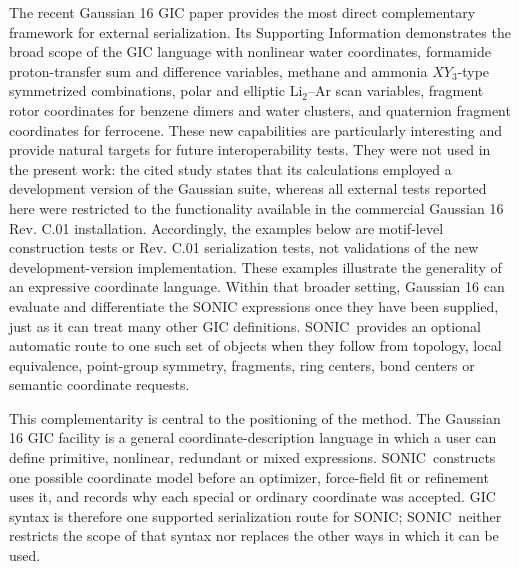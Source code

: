 \documentclass[journal=jctcce,manuscript=article,layout=traditional]{achemso}
\newcommand{\SONIC}{SONIC}
\theoremstyle{definition}
\begin{document}
The recent Gaussian 16 GIC paper provides the most direct complementary
framework for external serialization.  Its Supporting Information demonstrates
the broad scope of the GIC language with nonlinear water coordinates, formamide
proton-transfer sum and difference variables, methane and ammonia
\(XY_3\)-type symmetrized combinations, polar and elliptic Li\(_2\)--Ar scan
variables, fragment rotor coordinates for benzene dimers and water clusters,
and quaternion fragment coordinates for ferrocene.\cite{Marenich2025GIC}
These new capabilities are particularly interesting and provide natural targets
for future interoperability tests.  They were not used in the present work:
the cited study states that its calculations employed a development version of
the Gaussian suite, whereas all external tests reported here were restricted to
the functionality available in the commercial Gaussian 16 Rev. C.01
installation.  Accordingly, the examples below are motif-level construction
tests or Rev. C.01 serialization tests, not validations of the new
development-version implementation.
These examples illustrate the generality of an expressive coordinate language.
Within that broader setting, Gaussian 16 can evaluate and differentiate the
SONIC expressions once they have been supplied, just as it can treat many other
GIC definitions.  \SONIC\ provides an optional automatic route to one such set of
objects when they follow from topology, local equivalence, point-group symmetry,
fragments, ring centers, bond centers or semantic coordinate requests.

This complementarity is central to the positioning of the method.  The Gaussian
16 GIC facility is a general coordinate-description language in which a user can
define primitive, nonlinear, redundant or mixed expressions.  \SONIC\ constructs
one possible coordinate model before an optimizer, force-field fit or refinement
uses it, and records why each special or ordinary coordinate was accepted.  GIC
syntax is therefore one supported serialization route for \SONIC; \SONIC\ neither
restricts the scope of that syntax nor replaces the other ways in which it can
be used.
\end{document}

